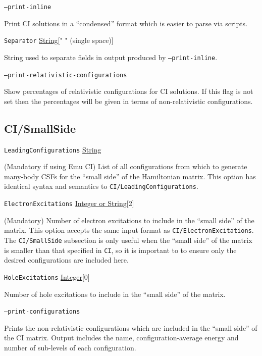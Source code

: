 \documentclass{report}
\begin{document}
\texttt{--print-inline}
\begin{adjustwidth}{1cm}{}
Print CI solutions in a ``condensed'' format which is easier to parse via scripts.
\end{adjustwidth}

\texttt{Separator} \uline{String}[" " (single space)]
\begin{adjustwidth}{1cm}{}
String used to separate fields in output produced by \texttt{--print-inline}.
\end{adjustwidth}

\texttt{--print-relativistic-configurations}
\begin{adjustwidth}{1cm}{}
Show percentages of relativistic configurations for CI solutions. If this flag is not set then the
percentages will be given in terms of non-relativistic configurations.
\end{adjustwidth}

\subsection{CI/SmallSide}
\texttt{LeadingConfigurations} \uline{String}
\begin{adjustwidth}{1cm}{}
(Mandatory if using Emu CI) List of all configurations from which to generate many-body CSFs for the 
``small side'' of the Hamiltonian matrix. This option has identical syntax and semantics to
\texttt{CI/LeadingConfigurations}.
\end{adjustwidth}

\texttt{ElectronExcitations} \uline{Integer or String}[2]
\begin{adjustwidth}{1cm}{}
(Mandatory) Number of electron excitations to include in the ``small side'' of the matrix. This option
accepts the same input format as \texttt{CI/ElectronExcitations}. The \texttt{CI/SmallSide} subsection
is only useful when the ``small side'' of the matrix is smaller than that specified in \texttt{CI}, so
it is important to to ensure only the desired configurations are included here.
\end{adjustwidth}

\texttt{HoleExcitations} \uline{Integer}[0]
\begin{adjustwidth}{1cm}{}
Number of hole excitations to include in the ``small side'' of the matrix.
\end{adjustwidth}

\texttt{--print-configurations}
\begin{adjustwidth}{1cm}{}
Prints the non-relativistic configurations which are included in the ``small side'' of the CI matrix.
Output includes the name, configuration-average energy and number of sub-levels of each configuration.
\end{adjustwidth}
\end{document}
